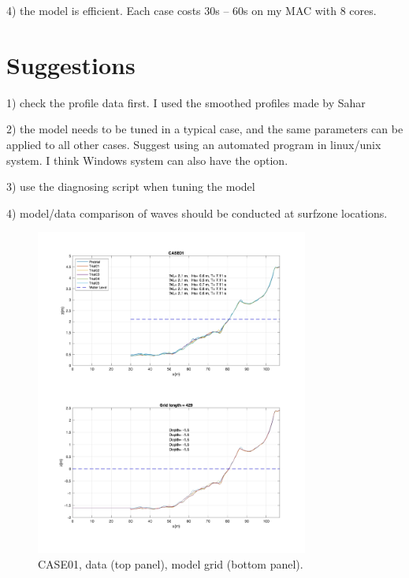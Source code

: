 \documentclass[preprint,10pt]{elsarticle}
\begin{document}
4) the model is efficient. Each case costs 30s -- 60s on my MAC with 8 cores. 

\section*{Suggestions}  

1) check the profile data first. I used the smoothed profiles made by Sahar

2) the model needs to be tuned in a typical case, and the same parameters can be applied to all other cases. Suggest using an automated program in linux/unix system. I think Windows system can also have the option. 

3) use the diagnosing script when tuning the model

4) model/data comparison of waves should be conducted at surfzone locations.  


\newpage

 \begin{figure}
\begin{center}
 \includegraphics[width=0.8\textwidth]{../data/preprocessing/plots/CASE01.jpg}
 \caption{CASE01, data (top panel), model grid (bottom panel).}
 \label{lineargrid}
 \end{center}
 \end{figure}
 
\end{document}
